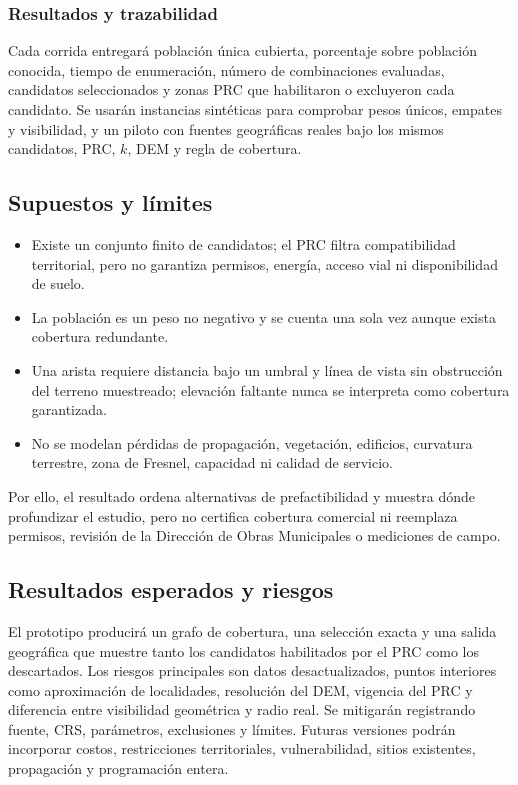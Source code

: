 \documentclass[12pt,letterpaper]{article}
\begin{document}
\subsubsection{Resultados y trazabilidad}
Cada corrida entregará población única cubierta, porcentaje sobre población conocida, tiempo de enumeración, número de combinaciones evaluadas, candidatos seleccionados y zonas PRC que habilitaron o excluyeron cada candidato. Se usarán instancias sintéticas para comprobar pesos únicos, empates y visibilidad, y un piloto con fuentes geográficas reales bajo los mismos candidatos, PRC, $k$, DEM y regla de cobertura.

\subsection{Supuestos y límites}
\begin{itemize}
\item Existe un conjunto finito de candidatos; el PRC filtra compatibilidad territorial, pero no garantiza permisos, energía, acceso vial ni disponibilidad de suelo.
\item La población es un peso no negativo y se cuenta una sola vez aunque exista cobertura redundante.
\item Una arista requiere distancia bajo un umbral y línea de vista sin obstrucción del terreno muestreado; elevación faltante nunca se interpreta como cobertura garantizada.
\item No se modelan pérdidas de propagación, vegetación, edificios, curvatura terrestre, zona de Fresnel, capacidad ni calidad de servicio.
\end{itemize}
Por ello, el resultado ordena alternativas de prefactibilidad y muestra dónde profundizar el estudio, pero no certifica cobertura comercial ni reemplaza permisos, revisión de la Dirección de Obras Municipales o mediciones de campo.

\subsection{Resultados esperados y riesgos}
El prototipo producirá un grafo de cobertura, una selección exacta y una salida geográfica que muestre tanto los candidatos habilitados por el PRC como los descartados. Los riesgos principales son datos desactualizados, puntos interiores como aproximación de localidades, resolución del DEM, vigencia del PRC y diferencia entre visibilidad geométrica y radio real. Se mitigarán registrando fuente, CRS, parámetros, exclusiones y límites. Futuras versiones podrán incorporar costos, restricciones territoriales, vulnerabilidad, sitios existentes, propagación y programación entera.
\end{document}
